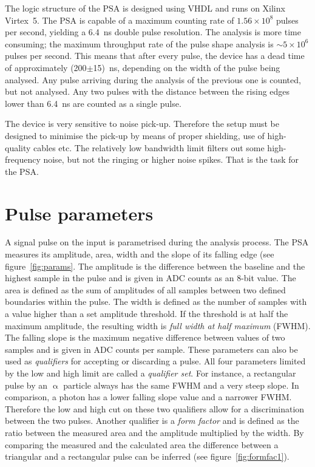 The logic structure of the PSA is designed using VHDL and runs on Xilinx Virtex~5. The PSA is capable of a maximum counting rate of $1.56\times10^8$ pulses per second, yielding a 6.4~ns double pulse resolution. The analysis is more time consuming; the maximum throughput rate of the pulse shape analysis is $\sim5\times10^6$ pulses per second. This means that after every pulse, the device has a dead time of approximately (200$\pm$15)~ns, depending on the width of the pulse being analysed. Any pulse arriving during the analysis of the previous one is counted, but not analysed. Any two pulses with the distance between the rising edges lower than 6.4~ns are counted as a single pulse.

The device is very sensitive to noise pick-up. Therefore the setup must be designed to minimise the pick-up by means of proper shielding, use of high-quality cables etc. The relatively low bandwidth limit filters out some high-frequency noise, but not the ringing or higher noise spikes. That is the task for the PSA.


\section{Pulse parameters}
A signal pulse on the input is parametrised during the analysis process. The PSA measures its amplitude, area, width and the slope of its falling edge (see figure~\ref{fig:params}. The amplitude is the difference between the baseline and the highest sample in the pulse and is given in ADC counts as an 8-bit value. The area is defined as the sum of amplitudes of all samples between two defined boundaries within the pulse. The width is defined as the number of samples with a value higher than a set amplitude threshold. If the threshold is at half the maximum amplitude, the resulting width is \emph{full width at half maximum} (FWHM). The falling slope is the maximum negative difference between values of two samples and is given in ADC counts per sample. These parameters can also be used as \emph{qualifiers} for accepting or discarding a pulse. All four parameters limited by the low and high limit are called a \emph{qualifier set}. For instance, a rectangular pulse by an $\upalpha$ particle always has the same FWHM and a very steep slope. In comparison, a photon has a lower falling slope value and a narrower FWHM. Therefore the low and high cut on these two qualifiers allow for a discrimination between the two pulses. Another qualifier is a \emph{form factor} and is defined as the ratio between the measured area and the amplitude multiplied by the width. By comparing the measured and the calculated area the difference between a triangular and a rectangular pulse can be inferred (see figure~\ref{fig:formfac1}).

